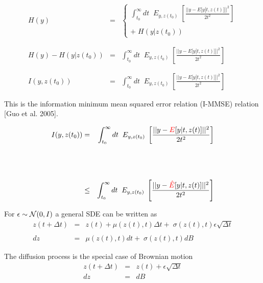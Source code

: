 {

{\huge
\begin{eqnarray*}
  H(y) & = & \left\{\begin{array}{l}\int_{t_0}^\infty dt \;\; E_{y,z(t_0)}\;\left[\frac{||y - E[y|t,z(t)]||^2}{2t^2}\right] \\ \\ +\;H(y|z(t_0))\end{array}\right. \\
  \\
  \\
  H(y) - H(y|z(t_0)) & = & \int_{t_0}^\infty dt \;\; E_{y,z(t_0)}\;\left[\frac{||y - E[y|t,z(t)]||^2}{2t^2}\right] \\
  \\
  \\
  I(y,z(t_0)) & = & \int_{t_0}^\infty dt \;\; E_{y,z(t_0)}\;\left[\frac{||y - E[y|t,z(t)]||^2}{2t^2}\right] 
\end{eqnarray*}

\vfill
This is the information minimum mean squared error relation (I-MMSE) relation [Guo et al. 2005].
}


{\huge
\begin{eqnarray*}
  I(y,z(t_0)) & = & \int_{t_0}^\infty dt \;\; E_{y,z(t_0)}\;\left[\frac{||y - {\color{red}E}[y|t,z(t)]||^2}{2t^2}\right]  \\
  \\
  \\
  \\
  & \leq & \int_{t_0}^\infty dt \;\; E_{y,z(t_0)}\;\left[\frac{||y - {\color{red}\hat{E}}[y|t,z(t)]||^2}{2t^2}\right]
\end{eqnarray*}
}


For $\epsilon \sim {\cal N}(0,I)$ a general SDE can be written as
\begin{eqnarray*}
z(t+\Delta t) & = & z(t) + \mu(z(t),t)\Delta t + \; \sigma(z(t),t)\epsilon\sqrt{\Delta t} \\
\\
dz & = & \mu(z(t),t)dt + \; \sigma(z(t),t)dB
\end{eqnarray*}

\vfill
The diffusion process is the special case of Brownian motion
\begin{eqnarray*}
z(t + \Delta t) & = & z(t) + \epsilon \sqrt{\Delta t} \\
dz & = & dB
\end{eqnarray*}

}
